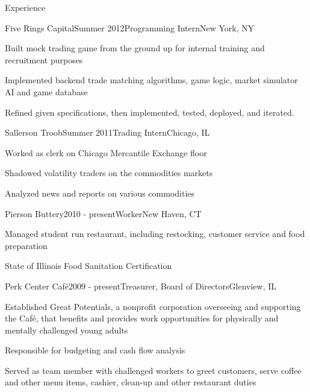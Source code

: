 \documentclass{resume} %
\begin{document}
\begin{rSection}{Experience}

\begin{rSubsection}{Five Rings Capital}{Summer 2012}{Programming Intern}{New York, NY} 
\item Built mock trading game from the ground up for internal training and recruitment purposes	
\item Implemented backend trade matching algorithms, game logic, market simulator AI and game database
\item Refined given specifications, then implemented, tested, deployed, and iterated.
\end{rSubsection}


\begin{rSubsection}{Sallerson Troob}{Summer 2011}{Trading Intern}{Chicago, IL}
\item Worked as clerk on Chicago Mercantile Exchange floor
\item Shadowed volatility traders on the commodities markets
\item Analyzed news and reports on various commodities
\end{rSubsection}


\begin{rSubsection}{Pierson Buttery}{2010 - present}{Worker}{New Haven, CT}
\item Managed student run restaurant, including restocking, customer service and food preparation
\item State of Illinois Food Sanitation Certification
\end{rSubsection}


\begin{rSubsection}{Perk Center Caf\'{e}}{2009 - present}{Treasurer, Board of Directors}{Glenview, IL}
\item Established Great Potentials, a nonprofit corporation overseeing and supporting the Caf\'{e}, that benefits and provides work opportunities for physically and mentally challenged young adults
\item Responsible for budgeting and cash flow analysis
\item Served as team member with challenged workers to greet customers, serve coffee and other menu items, cashier, clean-up and other restaurant duties
\end{rSubsection}

\end{rSection}
\end{document}
